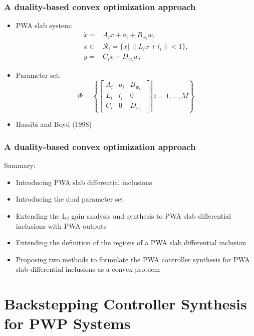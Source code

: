 \documentclass{beamer}
\newcommand{\beq}{\begin{equation*}}
\newcommand{\eeq}{\end{equation*}}
\newcommand{\bmat}{\left[\begin{array}}
\newcommand{\emat}{\end{array}\right]}
\begin{document}
\frame
  {
    \frametitle{A duality-based convex optimization approach}
    \begin{itemize}
    \item PWA slab system:
\begin{align}
\dot x =& A_{i}x+a_{i}+B_{w_{i}}w, \nonumber\\
x\in&{\mathcal R}_i=\{x |\ \|L_ix+l_i\|<1\}, \nonumber\\
y =& C_{i}x+D_{w_{i}}w, \nonumber
\end{align}
\item Parameter set:
\beq
\Phi =\left\{ \left.\bmat{ccc}A_{i}&a_{i}&B_{w_{i}}\\
L_i&l_i&0\\C_{i}&0&D_{w_{i}}\ \emat\right|\ i=1,\ldots,M \right\}
\eeq
\item {Hassibi and Boyd (1998)}
\end{itemize}
 }

\frame
  {
    \frametitle{A duality-based convex optimization approach}
    Summary:
    \begin{itemize}
    \item Introducing PWA slab differential inclusions
    \item Introducing the dual parameter set
    \item Extending the L$_2$ gain analysis and synthesis to PWA slab differential inclusions with PWA outputs
    \item Extending the definition of the regions of a PWA slab differential inclusion
    \item Proposing two methods to formulate the PWA controller synthesis for PWA slab differential inclusions as a convex problem
    \end{itemize}
}  

  \section[]{Backstepping Controller Synthesis for PWP Systems}
\end{document}
